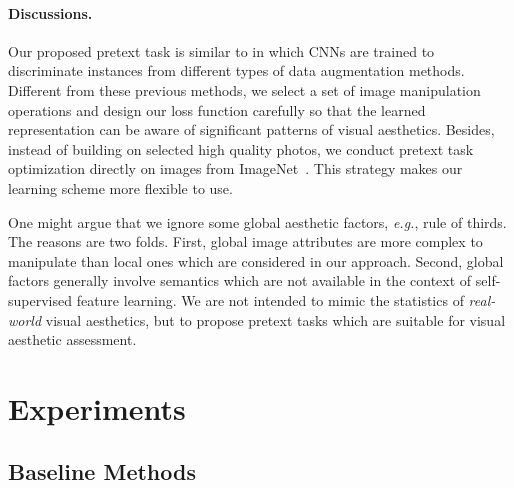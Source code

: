 \documentclass[letterpaper]{article}
\newcommand{\commentout}[1]{} %
\begin{document}
\paragraph{Discussions.}
Our proposed pretext task is similar to \cite{dosovitskiy2014discriminative,liu2017rankiqa} in which CNNs are trained to discriminate instances from different types of data augmentation methods.
Different from these previous methods, we select a set of image manipulation operations and design our loss function carefully so that the learned representation can be aware of significant patterns of visual aesthetics.
Besides, instead of building on selected high quality photos, we conduct pretext task optimization directly on images from ImageNet~\cite{deng2009imagenet}.
This strategy makes our learning scheme more flexible to use.

One might argue that we ignore some global aesthetic factors, \emph{e.g.}, rule of thirds.
The reasons are two folds.
First, global image attributes are more complex to manipulate than local ones which are considered in our approach.
Second, global factors generally involve semantics which are not available in the context of self-supervised feature learning.
We are not intended to mimic the statistics of \textit{real-world} visual aesthetics, but to propose pretext tasks which are suitable for visual aesthetic assessment\commentout{ and learn features \emph{using no manual labels}}.

\section{Experiments}

\subsection{Baseline Methods}
\label{sec:experimental_setup}
\end{document}
